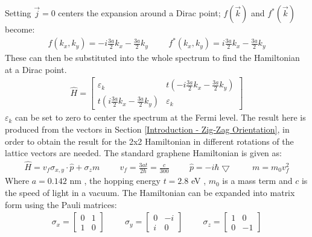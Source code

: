 			Setting $\vec{j}=0$  centers the expansion around a Dirac point; $f(\vec{k})$ and $f^{*}(\vec{k})$ become:
			\begin{align}
				f\left(k_{x}, k_{y}\right)=-i\frac{3a}{2}k_{x}-\frac{3a}{2}k_{y}
				\hspace{1cm}
				f^{*}\left(k_{x}, k_{y}\right)=i\frac{3a}{2}k_{x}-\frac{3a}{2}k_{y}
				\label{fofk}
			\end{align}
			These can then be substituted into the whole spectrum to find the Hamiltonian at a Dirac point.
			\begin{align}
				\hat{H}=
				\left[\begin{array}{ccc}
					\varepsilon_{k}&t\left(-i\frac{3a}{2}k_{x}-\frac{3a}{2}k_{y}\right)\\
					t\left(i\frac{3a}{2}k_{x}-\frac{3a}{2}k_{y}\right)&\varepsilon_{k}
				\end{array}\right]
			\end{align}
			$\varepsilon_{k}$ can be set to zero to center the spectrum at the Fermi level. The result here is produced from the vectors in Section \ref{Introduction - Zig-Zag Orientation}, in order to obtain the result for the 2x2 Hamiltonian in \cite{b2,b4} different rotations of the lattice vectors are needed. The standard graphene Hamiltonian is given as:
			\begin{align}
				\hat{H}=v_{f}\sigma_{x,y}\cdot\hat{p}+\sigma_{z}m
				\hspace{1cm}
				v_{f}=\frac{3at}{2\hbar}=\frac{c}{300}
				\hspace{1cm}
				\hat{p}=-i\hbar\bigtriangledown
				\hspace{1cm}
				m=m_{0}v_{f}^{2}
				\label{introduction - hamiltonian eq}
			\end{align}
			Where $a=0.142$ nm \cite{b8}, the hopping energy $t=2.8$ eV \cite{b1}, $m_{0}$ is a mass term \cite{b47} and $c$ is the speed of light in a vacuum. The Hamiltonian can be expanded into matrix form using the Pauli matrices:
			\begin{align}
				\sigma_{x}=
				\left[\begin{array}{ccc}
					0&1\\
					1&0
				\end{array}\right]
				\hspace{1cm}\sigma_{y}=
				\left[\begin{array}{ccc}
					0&-i\\
					i&0
				\end{array}\right]
				\hspace{1cm}\sigma_{z}=
				\left[\begin{array}{ccc}
					1&0\\
					0&-1
				\end{array}\right]
			\end{align}
